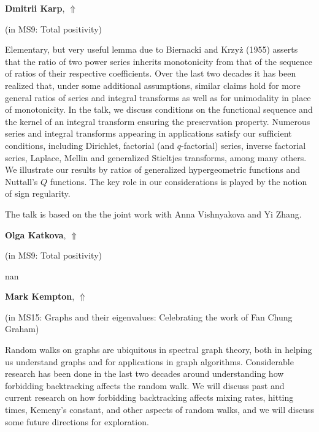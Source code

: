 \documentclass[ILAS2025-program.tex]{subfiles}
\begin{document}
     \hypertarget{down0044}{}\begin{ilasabstract}
    
    \textbf{Dmitrii Karp},  \hfill \hyperlink{up0044}{$\Uparrow$}
    
    (in {\color{mstitle}MS9: Total positivity})
        
        \mtskip
    Elementary, but very useful lemma due to Biernacki and Krzy\.{z} (1955) asserts that the ratio of two power series inherits monotonicity from that of the sequence of ratios of their respective  coefficients. Over the last two decades it has been realized that, under some additional assumptions, similar claims hold for more general ratios of series and integral
transforms as well as for unimodality in place of monotonicity. In the talk, we discuss conditions on the functional sequence and the kernel of an integral transform ensuring the preservation property. Numerous series and integral transforms appearing in applications satisfy our sufficient conditions, including Dirichlet, factorial (and $q$-factorial) series, inverse factorial series, Laplace, Mellin and generalized Stieltjes transforms, among many others.  We illustrate our results by ratios of generalized hypergeometric functions and Nuttall's $Q$ functions.  The key role in our considerations is played by the notion of sign regularity.

The talk is based on the the joint work with Anna Vishnyakova and Yi Zhang. 
\end{ilasabstract}
     \hypertarget{down0120}{}\begin{ilasabstract}
    
    \textbf{Olga Katkova},  \hfill \hyperlink{up0120}{$\Uparrow$}
    
    (in {\color{mstitle}MS9: Total positivity})
        
        \mtskip
    nan\end{ilasabstract}
     \hypertarget{down0140}{}\begin{ilasabstract}
    
    \textbf{Mark Kempton},  \hfill \hyperlink{up0140}{$\Uparrow$}
    
    (in {\color{mstitle}MS15: Graphs and their eigenvalues: Celebrating the work of Fan Chung Graham})
        
        \mtskip
    Random walks on graphs are ubiquitous in spectral graph theory, both in helping us understand graphs and for applications in graph algorithms.  Considerable research has been done in the last two decades around understanding how forbidding backtracking affects the random walk.  We will discuss past and current research on how forbidding backtracking affects mixing rates, hitting times, Kemeny's constant, and other aspects of random walks, and we will discuss some future directions for exploration.
\end{ilasabstract}
\end{document}

